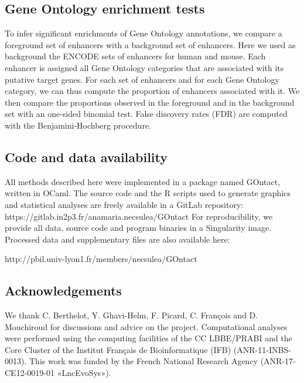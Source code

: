 \subsection*{Gene Ontology enrichment tests}
To infer significant enrichments of Gene Ontology annotations, we compare a foreground set of enhancers with a background set of enhancers. Here we used as background the ENCODE sets of enhancers for human and mouse. Each enhancer is assigned all Gene Ontology categories that are associated with its putative target genes. For each set of enhancers and for each Gene Ontology category, we can thus compute the proportion of enhancers associated with it. We then compare the proportions observed in the foreground and in the background set with an one-sided binomial test. False discovery rates (FDR) are computed with the Benjamini-Hochberg procedure.

\subsection*{Code and data availability}
All methods described here were implemented in a package named GOntact, written in OCaml. The source code and the R scripts used to generate graphics and statistical analyses are freely available in a GitLab repository: 
https://gitlab.in2p3.fr/anamaria.necsulea/GOntact
For reproducibility, we provide all data, source code and program binaries in a Singularity image. Processed data and supplementary files are also available here:

http://pbil.univ-lyon1.fr/members/necsulea/GOntact 


\subsection*{Acknowledgements}
We thank C. Berthelot, Y. Ghavi-Helm, F. Picard, C. François and D. Mouchiroud for discussions and advice on the project. Computational analyses were performed using the computing facilities of the CC LBBE/PRABI and the Core Cluster of the Institut Français de Bioinformatique (IFB) (ANR-11-INBS-0013). This work was funded by the French National Research Agency (ANR-17-CE12-0019-01 «LncEvoSys»). 
